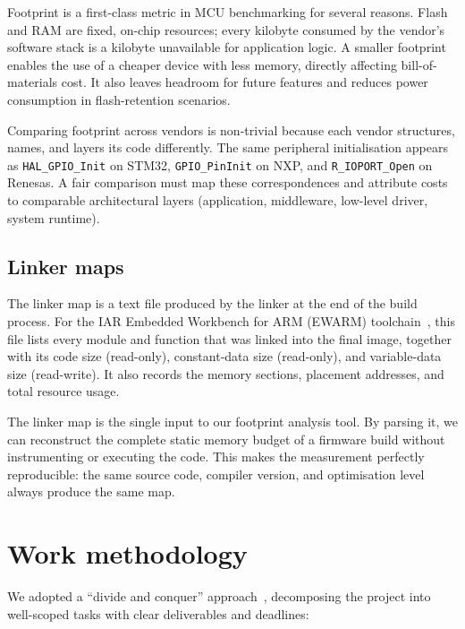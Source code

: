 Footprint is a first-class metric in MCU benchmarking for several reasons. Flash and RAM
are fixed, on-chip resources; every kilobyte consumed by the vendor's software stack is a
kilobyte unavailable for application logic. A smaller footprint enables the use of a
cheaper device with less memory, directly affecting bill-of-materials cost. It also leaves
headroom for future features and reduces power consumption in flash-retention scenarios.

Comparing footprint across vendors is non-trivial because each vendor structures, names,
and layers its code differently. The same peripheral initialisation appears as
\texttt{HAL\_GPIO\_Init} on STM32, \texttt{GPIO\_PinInit} on NXP, and \texttt{R\_IOPORT\_Open}
on Renesas. A fair comparison must map these correspondences and attribute costs to
comparable architectural layers (application, middleware, low-level driver, system runtime).

\subsection{Linker maps}
\label{sec:linker-maps}

The linker map is a text file produced by the linker at the end of the build process. For
the IAR Embedded Workbench for ARM (EWARM) toolchain~\cite{iar-ewarm}, this file lists
every module and function that was linked into the final image, together with its code size
(read-only), constant-data size (read-only), and variable-data size (read-write). It also
records the memory sections, placement addresses, and total resource usage.

The linker map is the single input to our footprint analysis tool. By parsing it, we can
reconstruct the complete static memory budget of a firmware build without instrumenting or
executing the code. This makes the measurement perfectly reproducible: the same source code,
compiler version, and optimisation level always produce the same map.

\section{Work methodology}
\label{sec:methodology}

We adopted a ``divide and conquer'' approach~\cite{divide-conquer}, decomposing the project
into well-scoped tasks with clear deliverables and deadlines:


